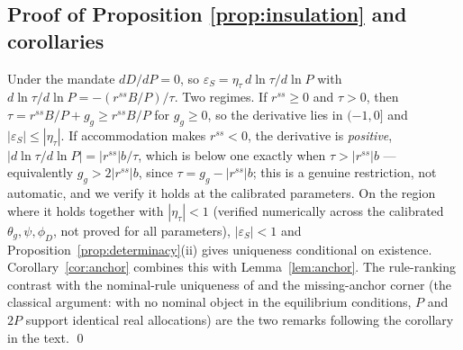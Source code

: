 \documentclass[12pt]{article}
\begin{document}
\subsection{Proof of Proposition \ref{prop:insulation} and corollaries}
Under the mandate $dD/dP=0$, so
$\varepsilon_S=\eta_\tau\,d\ln\tau/d\ln P$ with
$d\ln\tau/d\ln P=-(r^{ss}B/P)/\tau$. Two regimes. If $r^{ss}\ge0$ and
$\tau>0$, then $\tau=r^{ss}B/P+g_g\ge r^{ss}B/P$ for $g_g\ge0$, so the
derivative lies in $(-1,0]$ and $|\varepsilon_S|\le|\eta_\tau|$. If
accommodation makes $r^{ss}<0$, the derivative is \emph{positive},
$|d\ln\tau/d\ln P|=|r^{ss}|b/\tau$, which is below one exactly when
$\tau>|r^{ss}|b$ --- equivalently $g_g>2|r^{ss}|b$, since
$\tau=g_g-|r^{ss}|b$; this is a genuine restriction, not automatic, and we
verify it holds at the calibrated parameters. On the region where it
holds together with $|\eta_\tau|<1$ (verified numerically across the
calibrated $\theta_g,\psi,\phi_D$, not proved for all parameters),
$|\varepsilon_S|<1$ and Proposition~\ref{prop:determinacy}(ii) gives
uniqueness conditional on existence. Corollary~\ref{cor:anchor} combines
this with Lemma~\ref{lem:anchor}. The rule-ranking contrast with the
nominal-rule uniqueness of \citet{hagedorn2026dtpl} and the missing-anchor
corner (the classical argument: with no nominal object in the equilibrium
conditions, $P$ and $2P$ support identical real allocations) are the two
remarks following the corollary in the text. \qed
\end{document}
